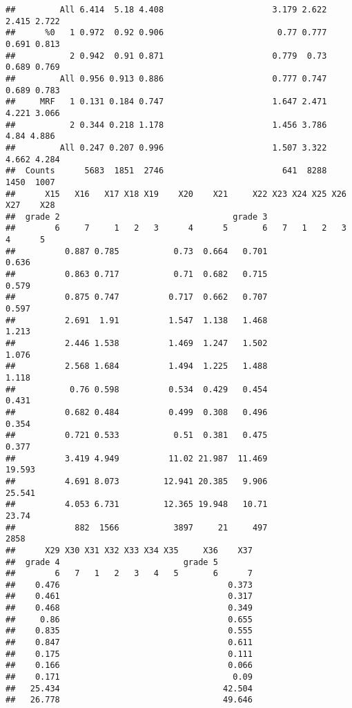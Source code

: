 \documentclass[
]{article}
\begin{document}
\begin{verbatim}
##         All 6.414  5.18 4.408                      3.179 2.622 2.415 2.722
##      %0   1 0.972  0.92 0.906                       0.77 0.777 0.691 0.813
##           2 0.942  0.91 0.871                      0.779  0.73 0.689 0.769
##         All 0.956 0.913 0.886                      0.777 0.747 0.689 0.783
##     MRF   1 0.131 0.184 0.747                      1.647 2.471 4.221 3.066
##           2 0.344 0.218 1.178                      1.456 3.786  4.84 4.886
##         All 0.247 0.207 0.996                      1.507 3.322 4.662 4.284
##  Counts      5683  1851  2746                        641  8288  1450  1007
##      X15   X16   X17 X18 X19    X20    X21     X22 X23 X24 X25 X26 X27    X28
##  grade 2                                   grade 3                           
##        6     7     1   2   3      4      5       6   7   1   2   3   4      5
##          0.887 0.785           0.73  0.664   0.701                      0.636
##          0.863 0.717           0.71  0.682   0.715                      0.579
##          0.875 0.747          0.717  0.662   0.707                      0.597
##          2.691  1.91          1.547  1.138   1.468                      1.213
##          2.446 1.538          1.469  1.247   1.502                      1.076
##          2.568 1.684          1.494  1.225   1.488                      1.118
##           0.76 0.598          0.534  0.429   0.454                      0.431
##          0.682 0.484          0.499  0.308   0.496                      0.354
##          0.721 0.533           0.51  0.381   0.475                      0.377
##          3.419 4.949          11.02 21.987  11.469                     19.593
##          4.691 8.073         12.941 20.385   9.906                     25.541
##          4.053 6.731         12.365 19.948   10.71                      23.74
##            882  1566           3897     21     497                       2858
##      X29 X30 X31 X32 X33 X34 X35     X36    X37
##  grade 4                         grade 5       
##        6   7   1   2   3   4   5       6      7
##    0.476                                  0.373
##    0.461                                  0.317
##    0.468                                  0.349
##     0.86                                  0.655
##    0.835                                  0.555
##    0.847                                  0.611
##    0.175                                  0.111
##    0.166                                  0.066
##    0.171                                   0.09
##   25.434                                 42.504
##   26.778                                 49.646

\end{verbatim}
\end{document}
